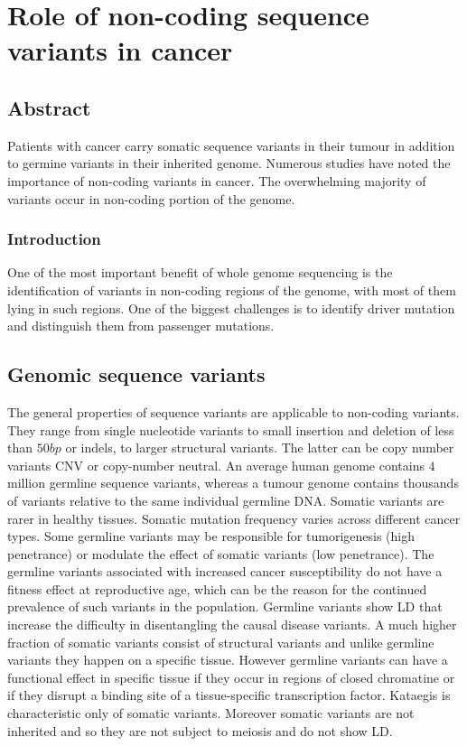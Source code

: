 \graphicspath{{chapters/papers/01/images}}
\chapter{Role of non-coding sequence variants in cancer}

\section{Abstract}
Patients with cancer carry somatic sequence variants in their tumour in addition to germine variants in their inherited genome.
Numerous studies have noted the importance of non-coding variants in cancer.
The overwhelming majority of variants occur in non-coding portion of the genome.

	\subsection{Introduction}
	One of the most important benefit of whole genome sequencing is the identification of variants in non-coding regions of the genome, with most of them lying in such regions.
	One of the biggest challenges is to identify driver mutation and distinguish them from passenger mutations.

\section{Genomic sequence variants}
The general properties of sequence variants are applicable to non-coding variants.
They range from single nucleotide variants to small insertion and deletion of less than $50bp$ or indels, to larger structural variants.
The latter can be copy number variants CNV or copy-number neutral.
An average human genome contains $4$ million germline sequence variants, whereas a tumour genome contains thousands of variants relative to the same individual germline DNA.
Somatic variants are rarer in healthy tissues.
Somatic mutation frequency varies across different cancer types.
Some germline variants may be responsible for tumorigenesis (high penetrance) or modulate the effect of somatic variants (low penetrance).
The germline variants associated with increased cancer susceptibility do not have a fitness effect at reproductive age, which can be the reason for the continued prevalence of such variants in the population.
Germline variants show LD that increase the difficulty in disentangling the causal disease variants.
A much higher fraction of somatic variants consist of structural variants and unlike germline variants they happen on a specific tissue.
However germline variants can have a functional effect in specific tissue if they occur in regions of closed chromatine or if they disrupt a binding site of a tissue-specific transcription factor.
Kataegis is characteristic only of somatic variants.
Moreover somatic variants are not inherited and so they are not subject to meiosis and do not show LD.

